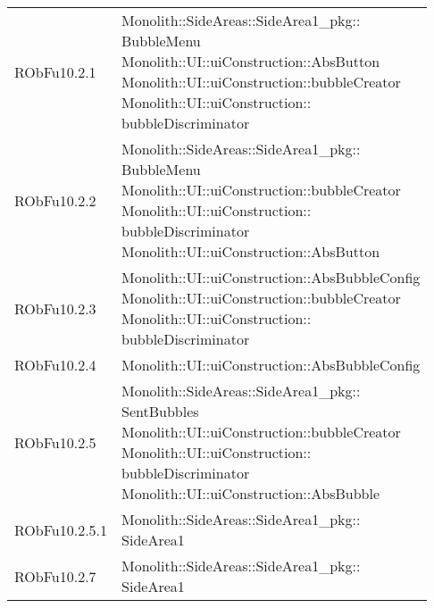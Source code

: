 \begin{center}
\begin{longtable}{|
*{1}{>{\centering\arraybackslash}m{2.5cm}|}
*{1}{>{\centering\arraybackslash}m{7.5cm}|}}
{\\Monolith::SideAreas::SideArea1\_pkg:: \\ \hfill SideArea1
\\}\\\hline
RObFu10.2.1 & \makecell[l]{Monolith::SideAreas::SideArea1\_pkg:: \\ \hfill BubbleMenu
\\Monolith::UI::uiConstruction::AbsButton
\\Monolith::UI::uiConstruction::bubbleCreator
\\Monolith::UI::uiConstruction:: \\ \hfill bubbleDiscriminator
\\}\\\hline
RObFu10.2.2 & \makecell[l]{Monolith::SideAreas::SideArea1\_pkg:: \\ \hfill BubbleMenu
\\Monolith::UI::uiConstruction::bubbleCreator
\\Monolith::UI::uiConstruction:: \\ \hfill bubbleDiscriminator
\\Monolith::UI::uiConstruction::AbsButton
\\}\\\hline
RObFu10.2.3 & \makecell[l]{Monolith::UI::uiConstruction::AbsBubbleConfig
\\Monolith::UI::uiConstruction::bubbleCreator
\\Monolith::UI::uiConstruction:: \\ \hfill bubbleDiscriminator
\\}\\\hline
RObFu10.2.4 & \makecell[l]{Monolith::UI::uiConstruction::AbsBubbleConfig
\\}\\\hline
RObFu10.2.5 & \makecell[l]{Monolith::SideAreas::SideArea1\_pkg:: \\ \hfill SentBubbles
\\Monolith::UI::uiConstruction::bubbleCreator
\\Monolith::UI::uiConstruction:: \\ \hfill bubbleDiscriminator
\\Monolith::UI::uiConstruction::AbsBubble
\\}\\\hline
RObFu10.2.5.1 & \makecell[l]{Monolith::SideAreas::SideArea1\_pkg:: \\ \hfill SideArea1
\\}\\\hline
RObFu10.2.7 & \makecell[l]{Monolith::SideAreas::SideArea1\_pkg:: \\ \hfill SideArea1
}
\end{longtable}
\end{center}
